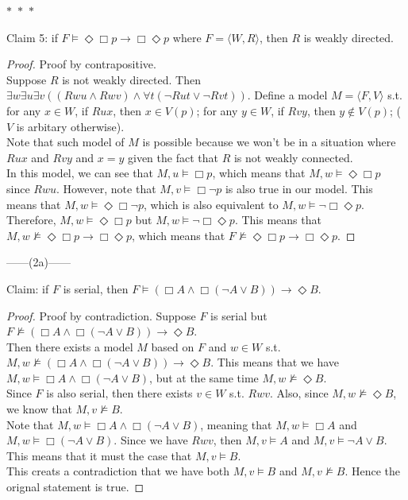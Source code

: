 \documentclass[12pt]{article}
\newcommand{\B}{\Box}
\newcommand{\D}{\Diamond}
\newcommand{\s}{\vDash}
\newcommand{\ns}{\nvDash}
\begin{document}
\noindent
\begin{center}
    $\ast$~$\ast$~$\ast$
\end{center}
Claim 5: if $F \vDash \D \B p \to \B \D p$ where $F = \langle W, R \rangle$, then $R$ is weakly directed. 
\begin{proof} Proof by contrapositive.\\
    Suppose $R$ is not weakly directed.
    Then $\exists w \exists u \exists v ((Rwu \land Rwv) \land \forall t(\neg Rut \lor \neg Rvt))$.
    Define a model $M  = \langle F, V \rangle$ s.t. for any $x \in W$, if $Rux$, then $x \in V(p)$; for any $y \in W$, if $Rvy$, then $y \notin V(p)$; ($V$ is arbitary otherwise).\\
    Note that such model of $M$ is possible because we won't be in a situation where $Rux$ and $Rvy$ and $x = y$ given the fact that $R$ is not weakly connected.\\
    In this model, we can see that $M, u \s \B p$, which means that $M, w \s \D \B p$ since $Rwu$.
    However, note that $M, v \s \B \neg p$ is also true in our model. 
    This means that $M, w \s \D \B \neg p$, which is also equivalent to $M, w \s \neg \B \D p$.\\
    Therefore, $M, w \s \D \B p$ but $M, w \s \neg \B \D p$.
    This means that $M, w \ns \D \B p \to \B \D p$, which means that $F \ns \D \B p \to \B \D p$.

\end{proof}

\newpage
\noindent
\begin{center}
    ------(2a)------
\end{center}
Claim: if $F$ is serial, then $F \s (\B A \land \B (\neg A \lor B)) \to \D B$.
\begin{proof} Proof by contradiction.
    Suppose $F$ is serial but $F \ns (\B A \land \B (\neg A \lor B)) \to \D B$.\\
    Then there exists a model $M$ based on $F$ and $w \in W$ s.t. $M, w \ns (\B A \land \B (\neg A \lor B)) \to \D B$.
    This means that we have $M, w \s \B A \land \B (\neg A \lor B)$, but at the same time $M, w \ns \D B$.\\
    Since $F$ is also serial, then there exists $v \in W$ s.t. $Rwv$. 
    Also, since $M, w \ns \D B$, we know that $M, v \ns B$.\\
    Note that $M, w \s \B A \land \B (\neg A \lor B)$, meaning that $M, w \s \B A$ and $M, w \s \B (\neg A \lor B)$. 
    Since we have $Rwv$, then $M, v \s A$ and $M, v \s \neg A \lor B$.
    This means that it must the case that $M, v \s B$.\\
    This creats a contradiction that we have both $M,v \s B$ and $M, v \ns B$.
    Hence the orignal statement is true.
\end{proof}
\end{document}
